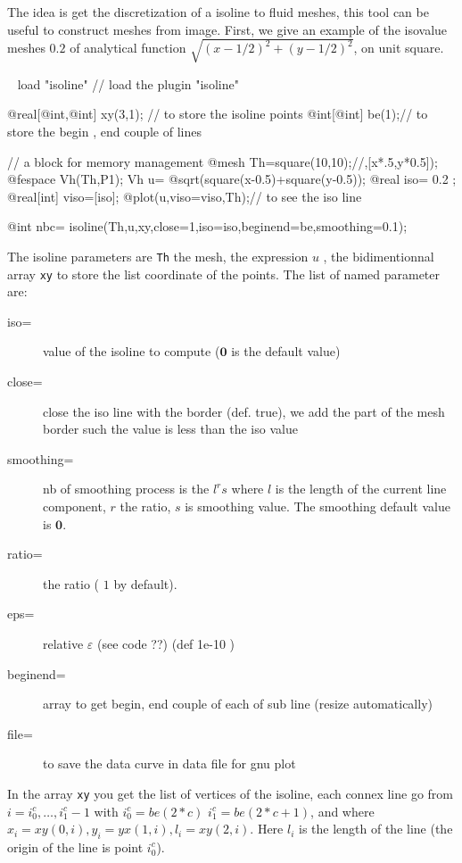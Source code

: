 \documentclass[a4paper,twoside,12pt]{book}
\begin{document}
 The idea is get the discretization of a isoline to fluid meshes, this tool  can be useful to
 construct meshes from image. First, we give an example of the isovalue meshes $0.2$  of analytical function $ \sqrt{(x-1/2)^2 +(y-1/2)^2}$,
 on unit square. 
\begin{example}
\label{ex:isoline.edp}~\hfill\break
\bFF
load "isoline" // load the plugin "isoline"

@real[@int,@int] xy(3,1); // to store the isoline points 
@int[@int] be(1);// to store the begin , end couple of lines
{// a block for memory management 
  @mesh Th=square(10,10);//,[x*.5,y*0.5]);
  @fespace Vh(Th,P1);
  Vh u= @sqrt(square(x-0.5)+square(y-0.5));
  @real iso= 0.2 ;
  @real[int] viso=[iso];
  @plot(u,viso=viso,Th);// to see the iso line 

  @int nbc= isoline(Th,u,xy,close=1,iso=iso,beginend=be,smoothing=0.1);
\eFF

The isoline parameters are \texttt{Th} the mesh, the expression $u$ , the  bidimentionnal array \texttt{xy}
to store the list coordinate of the points. The list of named parameter are:
\begin{description}
\item[iso=]  value of the isoline  to compute ($\bm{0}$ is the default value)
\item[close=] close the iso line with the border (def. true), we add the part of the mesh border such the value
 is less than the iso value 
\item[smoothing=] nb of smoothing process  is  the ${l} ^{r} {s} $ where
$l$ is the length of the current  line component, $r$ the ratio, $s$ is smoothing  value. The smoothing default value is $\bm{0}$.
\item[ratio=] the ratio ( $1$ by default). 
\item[eps=] relative $\varepsilon$  (see code ??)  (def 1e-10 )
\item[beginend=]  array to get begin, end couple of each of sub line  (resize automatically)
\item[file=] to save the data  curve in data file for gnu plot
\end{description}

In the array \texttt{xy} you get the list of vertices of the isoline,
each connex line go from $i= i_0^c ,\dots, i_1^c-1$ with $i_0^c =be(2*c)$  $i_1^c =be(2*c+1)$, and
  where $x_i= xy(0,i), y_i=yx( 1,i), l_i=xy(2,i) $. 
Here  $l_i$ is the length of the line (the origin of the line is point  $i_0^c$).

}
\end{example}
\end{document}
